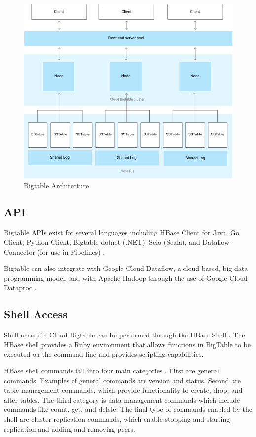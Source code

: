 \documentclass[9pt,twocolumn,twoside]{../../styles/osajnl}
\begin{document}
\begin{figure}[ht]
  \includegraphics[scale=0.45]{images/bigtable-architecture.jpg}
  \caption{Bigtable Architecture \cite{www-bigtabledocoverview}}
\end{figure}

\subsection{API}

Bigtable APIs exist for several languages including HBase Client for Java, Go Client, Python Client, Bigtable-dotnet (.NET), Scio (Scala), and Dataflow Connector (for use in Pipelines) \cite{www-bigtabledocapi}.

Bigtable can also integrate with Google Cloud Dataflow, a cloud based, big data programming model, and with Apache Hadoop through the use of Google Cloud Dataproc \cite{www-bigtabledocapi}.

\subsection{Shell Access}


Shell access in Cloud Bigtable can be performed through the HBase Shell \cite{www-hbaseshell}. The HBase shell provides a Ruby environment that allows functions in BigTable to be executed on the command line and provides scripting capabilities. 

HBase shell commands fall into four main categories \cite{www-hbaseshell2}.  First are general commands.  Examples of general commands are version and status.  Second are table management commands, which provide functionality to create, drop, and alter tables.  The third category is data management commands which include commands like count, get, and delete.  The final type of commands enabled by the shell are cluster replication commands, which enable stopping and starting replication and adding and removing peers.
\end{document}
